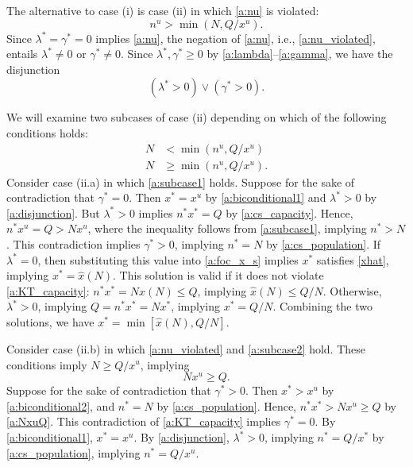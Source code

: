 \documentclass[12pt]{article}
\newcommand{\xh}{\hat{x}}
\begin{document}
The alternative to case (i) is case (ii) in which \eqref{a:nu} is violated:
\begin{equation}
\label{a:nu_violated}
n^u > \min(N, Q / x^u). 
\end{equation}
Since $\lambda^* = \gamma^* = 0$ implies \eqref{a:nu}, the negation of \eqref{a:nu}, i.e., \eqref{a:nu_violated}, entails $\lambda^* \neq 0$ or $\gamma^* \neq 0$. Since $\lambda^*, \gamma^* \geq 0$ by \eqref{a:lambda}--\eqref{a:gamma}, we have the disjunction
\begin{equation}
\label{a:disjunction}
(\lambda^* > 0) \vee (\gamma^* > 0). 
\end{equation}

We will examine two subcases of case (ii) depending on which of the following conditions holds:
\begin{align}
N & < \min(n^u, Q / x^u) \label{a:subcase1} \\
N & \geq \min(n^u, Q / x^u). \label{a:subcase2}
\end{align}
Consider case (ii.a) in which \eqref{a:subcase1} holds. Suppose for the sake of contradiction that $\gamma^* = 0$. Then $x^* = x^u$ by \eqref{a:biconditional1} and $\lambda^* > 0$ by \eqref{a:disjunction}. But $\lambda^* > 0$ implies $n^* x^* = Q$ by \eqref{a:cs_capacity}. Hence, $n^* x^u = Q > N x^u$, where the inequality follows from \eqref{a:subcase1}, implying $n^* > N$. This contradiction implies $\gamma^* > 0$, implying $n^* = N$ by \eqref{a:cs_population}. If $\lambda^* = 0$, then substituting this value into \eqref{a:foc_x_s} implies $x^*$ satisfies \eqref{xhat}, implying $x^* = \xh(N)$. This solution is valid if it does not violate \eqref{a:KT_capacity}: $n^* x^* = N \xh(N) \leq Q$, implying $\xh(N) \leq Q/N$. Otherwise, $\lambda^* > 0$, implying $Q = n^* x^* = N x^*$, implying $x^* = Q/N$. Combining the two solutions, we have $x^* = \min[\xh(N), Q/N]$. 

Consider case (ii.b) in which \eqref{a:nu_violated} and \eqref{a:subcase2} hold. These conditions imply $N \geq Q / x^u$, implying
\begin{equation}
\label{a:NxuQ}
N x^u \geq Q.
\end{equation} 
Suppose for the sake of contradiction that $\gamma^* > 0$. Then $x^* > x^u$ by \eqref{a:biconditional2}, and $n^* = N$ by \eqref{a:cs_population}. Hence, $n^* x^* > N x^u \geq Q$ by \eqref{a:NxuQ}. This contradiction of \eqref{a:KT_capacity} implies $\gamma^* = 0$. By \eqref{a:biconditional1}, $x^* = x^u$. By \eqref{a:disjunction}, $\lambda^* > 0$, implying $n^* = Q/x^*$ by \eqref{a:cs_population}, implying $n^* = Q/x^u$. 
\end{document}
